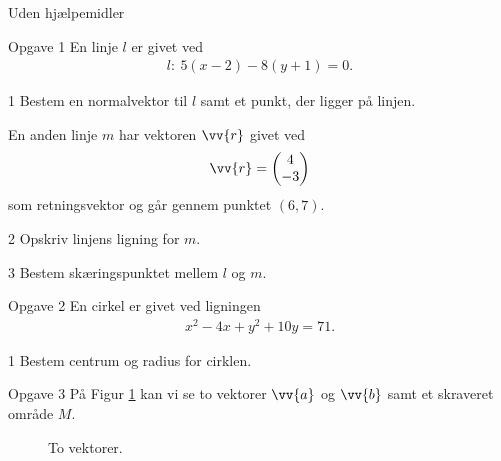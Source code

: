 \begin{center}
	\Large
	Uden hjælpemidler	
\end{center}
%
%
%
%
%
\begin{opgavetekst}{Opgave 1}
	En linje $l$ er givet ved
	\begin{align*}
		l: \ 5(x - 2) - 8(y+1) = 0.
	\end{align*}
\end{opgavetekst}
%
%
\begin{delopgave}{1}
	Bestem en normalvektor til $l$ samt et punkt, der ligger på linjen.
\end{delopgave}
\begin{meretekst}
	En anden linje $m$ har vektoren $\vv{r}$ givet ved
	\begin{align*}
		\vv{r} = 
		\begin{pmatrix}
			4 \\ -3		
		\end{pmatrix}
	\end{align*}
	som retningsvektor og går gennem punktet $(6,7)$.
\end{meretekst}
\begin{delopgave}{2}
	Opskriv linjens ligning for $m$.
\end{delopgave}
\begin{delopgave}{3}
	Bestem skæringspunktet mellem $l$ og $m$.
\end{delopgave}
%
%
%
%
%
\begin{opgavetekst}{Opgave 2}
	En cirkel er givet ved ligningen
	\begin{align*}
		x^2 - 4x + y^2 + 10y = 71.
	\end{align*}
\end{opgavetekst}
%
%
\begin{delopgave}{1}
Bestem centrum og radius for cirklen. 
\end{delopgave}
%
%
%
%
%
\begin{opgavetekst}{Opgave 3}
	På Figur \ref{fig:vektorer} kan vi se to vektorer $\vv{a}$ og $\vv{b}$ samt et skraveret område $M$.
	\begin{figure}[H]
		\centering
		\caption{To vektorer.}
		\label{fig:vektorer}
	\end{figure}
	\phantom{h}
\end{opgavetekst}
